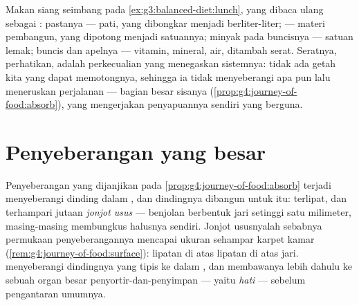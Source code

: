 \begin{example}\label{ex:g7:digestion-and-nutrients:lunch}
Makan siang seimbang pada \cref{ex:g3:balanced-diet:lunch}, yang
dibaca ulang sebagai : pastanya --- pati, yang dibongkar
menjadi  berliter-liter;  --- materi pembangun, yang
dipotong menjadi satuannya; minyak pada buncisnya --- satuan lemak;
buncis dan apelnya --- vitamin, mineral, air, ditambah serat. Seratnya,
perhatikan, adalah perkecualian yang menegaskan sistemnya: tidak ada
getah kita yang dapat memotongnya, sehingga ia tidak menyeberangi apa
pun lalu meneruskan perjalanan --- bagian besar sisanya
(\cref{prop:g4:journey-of-food:absorb}), yang mengerjakan penyapuannya
sendiri yang berguna.
\end{example}

\section{Penyeberangan yang besar}

\begin{proposition}\label{prop:g7:digestion-and-nutrients:absorption}
Penyeberangan yang dijanjikan pada
\cref{prop:g4:journey-of-food:absorb} terjadi menyeberangi dinding
dalam , dan dindingnya dibangun untuk itu: terlipat, dan
terhampari jutaan \emph{jonjot usus} --- benjolan
berbentuk jari setinggi satu milimeter, masing-masing membungkus
 halusnya sendiri. Jonjot ususnyalah sebabnya permukaan
penyeberangannya mencapai ukuran sehampar karpet kamar
(\cref{rem:g4:journey-of-food:surface}): lipatan di atas lipatan di
atas jari.  menyeberangi dindingnya yang tipis ke dalam
, dan  membawanya lebih dahulu ke sebuah organ besar
penyortir-dan-penyimpan --- yaitu \emph{hati} --- sebelum
pengantaran umumnya.
\end{proposition}
\admitted

